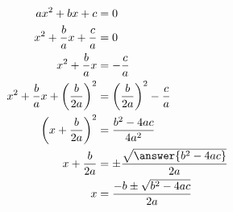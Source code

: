 \begin{algorithm}
  \lipsum[1][1-3]
\end{algorithm}

\begin{axiom}
  \lipsum[1][1-3]
\end{axiom}

\begin{claim}
  \lipsum[1][1-3]
\end{claim}

\begin{conclusion}
  \lipsum[1][1-3]
\end{conclusion}

\begin{condition}
  \lipsum[1][1-3]
\end{condition}

\begin{conjecture}
  \lipsum[1][1-3]
\end{conjecture}

\begin{corollary}
  \lipsum[1][1-3]
\end{corollary}

\begin{criterion}
  \lipsum[1][1-3]
\end{criterion}

\begin{definition}
  \lipsum[1][1-3]
\end{definition}

\begin{example}
  \lipsum[1][1-3]
  \begin{solution}
    \lipsum[1][1-3]
    \begin{align*}
      ax^2 + bx + c &= 0 \\
      x^2 + \frac{b}{a}x + \frac{c}{a} &= 0 \\
      x^2 + \frac{b}{a}x &= -\frac{c}{a} \\
      x^2 + \frac{b}{a}x + \left(\frac{b}{2a}\right)^2 &= \left(\frac{b}{2a}\right)^2 - \frac{c}{a} \\
      \left(x + \frac{b}{2a}\right)^2 &= \frac{b^2 - 4ac}{4a^2} \\
      x + \frac{b}{2a} &= \pm \frac{\sqrt{\answer{b^2 - 4ac}}}{2a} \\
      x &= \frac{-b \pm \sqrt{b^2 - 4ac}}{2a}
      \end{align*}
    \lipsum[1][1-3]
  \end{solution}
\end{example}

